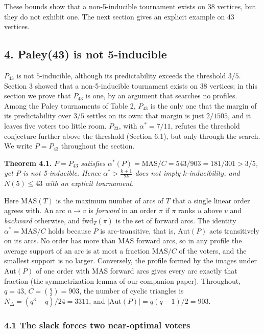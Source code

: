 \documentclass[
]{article}
\begin{document}
These bounds show that a non-5-inducible tournament exists on 38
vertices, but they do not exhibit one. The next section gives an
explicit example on \(43\) vertices.

\subsection{4. Paley(43) is not
5-inducible}\label{paley43-is-not-5-inducible}

\(P_{43}\) is not \(5\)-inducible, although its predictability exceeds
the threshold \(3/5\). Section 3 showed that a non-5-inducible
tournament exists on \(38\) vertices; in this section we prove that
\(P_{43}\) is one, by an argument that searches no profiles. Among the
Paley tournaments of Table 2, \(P_{43}\) is the only one that the margin
of its predictability over \(3/5\) settles on its own: that margin is
just \(2/1505\), and it leaves five voters too little room. \(P_{23}\),
with \(\alpha^{*} = 7/11\), refutes the threshold conjecture further
above the threshold (Section 6.1), but only through the search. We write
\(P = P_{43}\) throughout the section.

\textbf{Theorem 4.1.} \emph{\(P = P_{43}\) satisfies
\(\alpha^{*}(P) = \mathrm{MAS}/C = 543/903
= 181/301 > 3/5\), yet \(P\) is not 5-inducible. Hence
\(\alpha^{*} > \frac{k+1}{2k}\) does not imply \(k\)-inducibility, and
\(N(5) \le 43\) with an explicit tournament.}

Here \(\mathrm{MAS}(T)\) is the maximum number of arcs of \(T\) that a
single linear order agrees with. An arc \(u \to v\) is \emph{forward} in
an order \(\pi\) if \(\pi\) ranks \(u\) above \(v\) and \emph{backward}
otherwise, and \(\mathrm{fwd}_T(\pi)\) is the set of forward arcs. The
identity \(\alpha^{*} = \mathrm{MAS}/C\) holds because \(P\) is
arc-transitive, that is, \(\mathrm{Aut}(P)\) acts transitively on its
arcs. No order has more than \(\mathrm{MAS}\) forward arcs, so in any
profile the average support of an arc is at most a fraction
\(\mathrm{MAS}/C\) of the voters, and the smallest support is no larger.
Conversely, the profile formed by the images under \(\mathrm{Aut}(P)\)
of one order with \(\mathrm{MAS}\) forward arcs gives every arc exactly
that fraction (the symmetrization lemma of our companion paper).
Throughout, \(q = 43\), \(C = \binom{q}{2} = 903\), the number of cyclic
triangles is \(N_{\Delta} = (q^3 - q)/24 = 3311\), and
\(|\mathrm{Aut}(P)| = q(q-1)/2 = 903\).

\subsubsection{4.1 The slack forces two near-optimal
voters}\label{the-slack-forces-two-near-optimal-voters}
\end{document}
